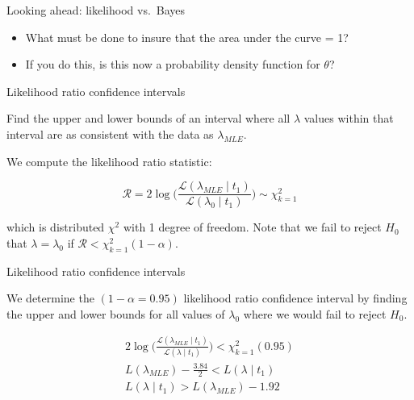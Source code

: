 \documentclass[ignorenonframetext,]{beamer}
\providecommand{\tightlist}{%
  \setlength{\itemsep}{0pt}\setlength{\parskip}{0pt}}
\begin{document}
\begin{frame}{Looking ahead: likelihood vs.~Bayes}

\begin{center}

\end{center}

\begin{itemize}
\tightlist
\item
  What must be done to insure that the area under the curve = 1?
\item
  If you do this, is this now a probability density function for
  \(\theta\)?
\end{itemize}

\end{frame}

\begin{frame}{Likelihood ratio confidence intervals}

Find the upper and lower bounds of an interval where all \(\lambda\)
values within that interval are as consistent with the data as
\(\lambda_{MLE}\).

We compute the likelihood ratio statistic:

\[\mathscr{R} = 2\log\Big(\frac{\mathscr{L}(\lambda_{MLE} \mid t_{1})}{\mathscr{L}(\lambda_{0}\mid t_{1})}\Big)  \sim \chi_{k=1}^{2}\]

which is distributed \(\chi^{2}\) with 1 degree of freedom. Note that we
fail to reject \(H_{0}\) that \(\lambda = \lambda_{0}\) if
\(\mathscr{R} < \chi_{k=1}^{2}(1 - \alpha)\).

\end{frame}

\begin{frame}{Likelihood ratio confidence intervals}

We determine the \((1-\alpha = 0.95)\) likelihood ratio confidence
interval by finding the upper and lower bounds for all values of
\(\lambda_{0}\) where we would fail to reject \(H_{0}\).

\begin{eqnarray*}
2\log\Big(\frac{\mathscr{L}(\lambda_{MLE} \mid t_{1})}{\mathscr{L}(\lambda\mid t_{1})}\Big) < \chi_{k=1}^{2}(0.95)\\
L(\lambda_{MLE}) - \frac{3.84}{2} < L(\lambda\mid t_{1})\\
L(\lambda\mid t_{1}) > L(\lambda_{MLE}) - 1.92
\end{eqnarray*}

\end{frame}
\end{document}
